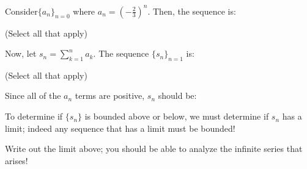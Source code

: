\documentclass{ximera}
\author{Jim Talamo}
\begin{document}
\begin{exercise}
Consider$\{a_n \}_{n=0}$ where $a_n = \left(-\frac{2}{3}\right)^n$.  Then, the sequence is:

\begin{selectAll}
\end{selectAll}
(Select all that apply)

Now, let $s_n = \sum_{k=1}^{n} a_k$.  The sequence $\{s_n \}_{n=1}$ is:
\begin{selectAll}
\end{selectAll}
(Select all that apply)

\begin{hint}
Since all of the $a_n$ terms are positive, $s_n$ should be:

\begin{multipleChoice}
\end{multipleChoice}

To determine if $\{s_n\}$ is bounded above or below, we must determine if $s_n$ has a limit; indeed any sequence that has a limit must be bounded!

Write out the limit above; you should be able to analyze the infinite series that arises!
\end{hint}
\end{exercise}
\end{document}
